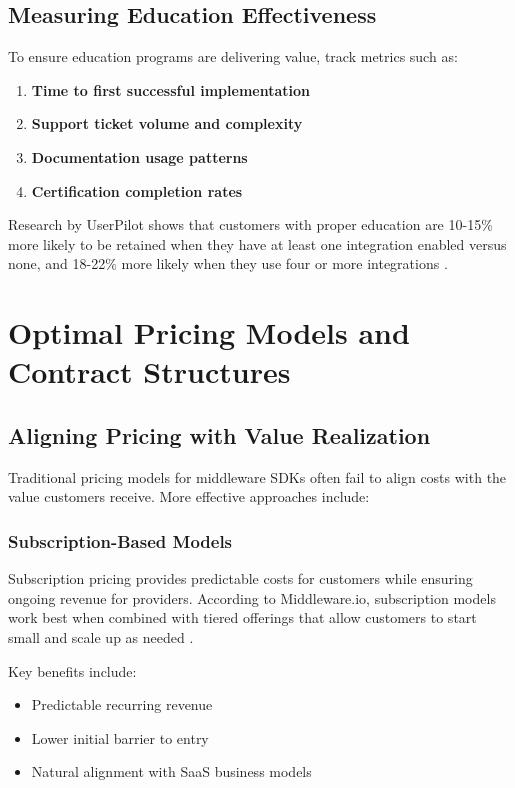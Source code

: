 \documentclass[11pt,a4paper]{article}
\begin{document}
\subsection{Measuring Education Effectiveness}

To ensure education programs are delivering value, track metrics such as:

\begin{enumerate}
    \item \textbf{Time to first successful implementation}
    \item \textbf{Support ticket volume and complexity}
    \item \textbf{Documentation usage patterns}
    \item \textbf{Certification completion rates}
\end{enumerate}

Research by UserPilot shows that customers with proper education are 10-15\% more likely to be retained when they have at least one integration enabled versus none, and 18-22\% more likely when they use four or more integrations \cite{userpilot2023}.

\section{Optimal Pricing Models and Contract Structures}

\subsection{Aligning Pricing with Value Realization}

Traditional pricing models for middleware SDKs often fail to align costs with the value customers receive. More effective approaches include:

\subsubsection{Subscription-Based Models}

Subscription pricing provides predictable costs for customers while ensuring ongoing revenue for providers. According to Middleware.io, subscription models work best when combined with tiered offerings that allow customers to start small and scale up as needed \cite{middleware2023}.

Key benefits include:
\begin{itemize}
    \item Predictable recurring revenue
    \item Lower initial barrier to entry
    \item Natural alignment with SaaS business models
\end{itemize}
\end{document}
